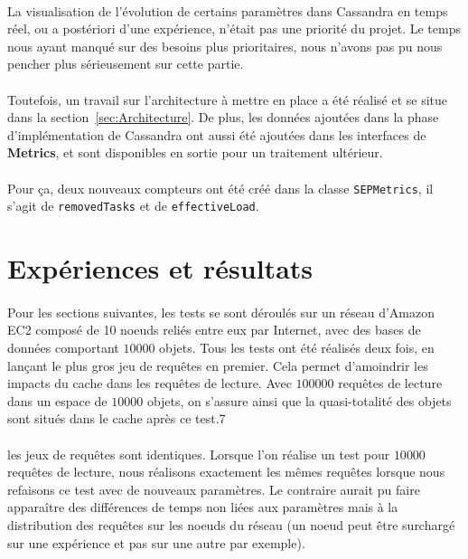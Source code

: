 \documentclass[12pt]{article}
\newcommand{\class}[1]{\texttt{#1}}
\begin{document}
\paragraph{}La visualisation de l'évolution de certains paramètres dans Cassandra en temps réel, ou a postériori d'une expérience, n'était pas une priorité du projet. Le temps nous ayant manqué sur des besoins plus prioritaires, nous n'avons pas pu nous pencher plus sérieusement sur cette partie.

\paragraph{}Toutefois, un travail sur l'architecture à mettre en place a été réalisé et se situe dans la section~\ref{sec:Architecture}. De plus, les données ajoutées dans la phase d'implémentation de Cassandra ont aussi été ajoutées dans les interfaces de \textbf{Metrics}, et sont disponibles en sortie pour un traitement ultérieur.


\paragraph{}Pour ça, deux nouveaux compteurs ont été créé dans la classe \class{SEPMetrics}, il s'agit de \texttt{removedTasks} et de \texttt{effectiveLoad}.

\section{Expériences et résultats}

\paragraph{}Pour les sections suivantes, les tests se sont déroulés sur un réseau d'Amazon EC2 composé de 10 noeuds reliés entre eux par Internet, avec des bases de données comportant $10 000$ objets. Tous les tests ont été réalisés deux fois, en lançant le plus gros jeu de requêtes en premier. Cela permet d'amoindrir les impacts du cache dans les requêtes de lecture. Avec $100 000$ requêtes de lecture dans un espace de $10 000$ objets, on s'assure ainsi que la quasi-totalité des objets sont situés dans le cache après ce test.7

\paragraph{}les jeux de requêtes sont identiques. Lorsque l'on réalise un test pour $10 000$ requêtes de lecture, nous réalisons exactement les mêmes requêtes lorsque nous refaisons ce test avec de nouveaux paramètres. Le contraire aurait pu faire apparaître des différences de temps non liées aux paramètres mais à la distribution des requêtes sur les noeuds du réseau (un noeud peut être surchargé sur une expérience et pas sur une autre par exemple).
\end{document}
